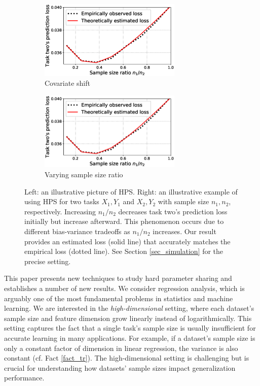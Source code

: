 \begin{figure}[!t]
	\begin{subfigure}[t]{0.5\textwidth}
		\centering
		\includegraphics[width=0.745\textwidth,valign=t]{figures/sample_ratio_c2_400.eps}
		\caption{Covariate shift}
		\label{fig_intro_arch}
	\end{subfigure}\hfill
	\begin{subfigure}[t]{0.5\textwidth}
		\centering
		\includegraphics[width=0.745\textwidth,valign=t]{figures/sample_ratio_c2_400.eps}
		\caption{Varying sample size ratio}
		\label{fig_intro_sample_size_b}
	\end{subfigure}
	\vspace{-0.1in}
	\caption{
	Left: an illustrative picture of HPS.
	Right: an illustrative example of using HPS for two tasks $X_1, Y_1$ and $X_2, Y_2$ with sample size $n_1, n_2$, respectively.
	Increasing $n_1/n_2$ decreases task two's prediction loss initially but increase afterward. This phenomenon occurs due to different bias-variance tradeoffs as $n_1/n_2$ increases. Our result provides an estimated loss (solid line) that accurately matches the empirical loss (dotted line).
	See Section \ref{sec_simulation} for the precise setting.}
	\label{fig_intro_sample_size}
\end{figure}



This paper presents new techniques to study hard parameter sharing and establishes a number of new results.
We consider regression analysis, which is arguably one of the most fundamental problems in statistics and machine learning.
We are interested in the \textit{high-dimensional} setting, where each dataset's sample size and feature dimension grow linearly instead of logarithmically.
This setting captures the fact that a single task's sample size is usually insufficient for accurate learning in many applications.
For example, if a dataset's sample size is only a constant factor of dimension in linear regression, the variance is also constant (cf. Fact \ref{fact_tr}).
The high-dimensional setting is challenging but is crucial for understanding how datasets' sample sizes impact generalization performance.


